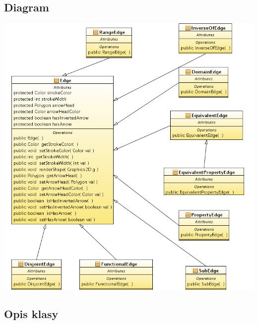 \documentclass[a4paper,10pt]{article}
\begin{document}
\subsection{Diagram}

\includegraphics[width=\linewidth]{./modelowanie/OV_UML/EdgeClassDiagram.png}

\subsection{Opis klasy}
\end{document}
